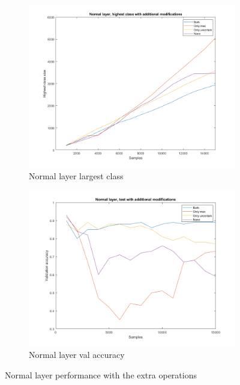\begin{figure}
    \centering
    \begin{subfigure}[b]{.49\textwidth}
        \centering
        \includegraphics[width=\textwidth]{figures/normalhigh.png}
        \caption{Normal layer largest class}
        \label{sfig:ex:extra:normalhigh}
    \end{subfigure}
    \hfill
    \begin{subfigure}[b]{.49\textwidth}
        \centering
        \includegraphics[width=\textwidth]{figures/normalva.png}
        \caption{Normal layer val accuracy}
        \label{sfig:ex:extra:normalva}
    \end{subfigure}
    \caption{Normal layer performance with the extra operations}
    \label{fig:ex:extra:normal}
\end{figure}


